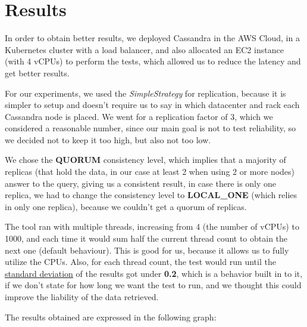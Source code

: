 \documentclass[runningheads]{llncs}
\begin{document}
\section{Results}

In order to obtain better results, we deployed Cassandra in the AWS Cloud, in a Kubernetes cluster with a load balancer, and also allocated an EC2 instance (with 4 vCPUs) to perform the tests, which allowed us to reduce the latency and get better results.\par

For our experiments, we used the \emph{SimpleStrategy} for replication, because it is simpler to setup and doesn't require us to say in which datacenter and rack each Cassandra node is placed. We went for a replication factor of 3, which we considered a reasonable number, since our main goal is not to test reliability, so we decided not to keep it too high, but also not too low.\par

We chose the \textbf{QUORUM} consistency level, which implies that a majority of replicas (that hold the data, in our case at least 2 when using 2 or more nodes) answer to the query, giving us a consistent result, in case there is only one replica, we had to change the consistency level to \textbf{LOCAL\_ONE} (which relies in only one replica), because we couldn't get a quorum of replicas.\par

The tool ran with multiple threads, increasing from 4 (the number of vCPUs) to 1000, and each time it would sum half the current thread count to obtain the next one (default behaviour). This is good for us, because it allows us to fully utilize the CPUs. Also, for each thread count, the test would run until the \underline{standard deviation} of the results got under \textbf{0.2}, which is a behavior built in to it, if we don't state for how long we want the test to run, and we thought this could improve the liability of the data retrieved.\par

The results obtained are expressed in the following graph:
\end{document}
